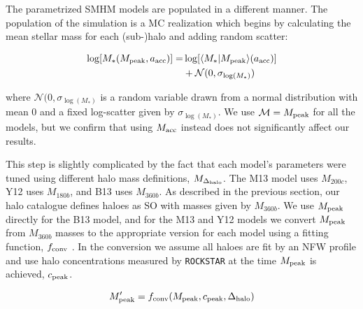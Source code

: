 \documentclass[a4paper,fleqn,usenatbib]{mnras}
\begin{document}
The parametrized SMHM models are populated in a different manner.  The population of the simulation is a MC realization which begins by calculating the mean stellar mass for each (sub-)halo and adding random scatter:
%
\begin{linenomath}
\begin{align}
\label{eq:mstar_assign}
\log[M_*(M_{\rm peak}, a_{\rm acc})] =& \log[\langle M_* | M_{\rm peak}\rangle(a_{\rm acc})] \\ \nonumber
&+ \mathcal{N}(0,\sigma_{\log(M_*)})
\end{align}
\end{linenomath}
%
where $\mathcal{N}(0,\sigma_{\log(M_*)}$ is a random variable drawn from a normal distribution with mean 0 and a fixed log-scatter given by $\sigma_{\log(M_*)}$.  We use $\mathcal{M} = M_{\rm peak}$ for all the models, but we confirm that using $M_{\rm acc}$ instead does not significantly affect our results.

This step is slightly complicated by the fact that each model's parameters were tuned using different halo mass definitions, $M_{\Delta_{\rm halo}}$. The M13 model uses $M_{200c}$,  Y12 uses $M_{180b}$, and B13 uses $M_{360b}$.  As described in the previous section, our halo catalogue defines haloes as SO with masses given by $M_{360b}$.  We use $M_{\rm peak}$ directly for the B13 model, and for the M13 and Y12 models we convert $M_{\rm peak}$ from $M_{360b}$ masses to the appropriate version for each model using a fitting function, $f_{\rm conv}$ \citep[see appendix C in][]{Hu:2003dr}.  In the conversion we assume all haloes are fit by an NFW profile \citep{Navarro:1997if} and use halo concentrations measured by {\tt ROCKSTAR} at the time $M_{\rm peak}$ is achieved, $c_{\rm peak}$.
%
\begin{linenomath}
\begin{equation}
M_{\rm peak}^{\prime} = f_{\rm conv}(M_{\rm peak}, c_{\rm peak}, \Delta_{\rm halo})
\end{equation}
\end{linenomath}
%
\end{document}
